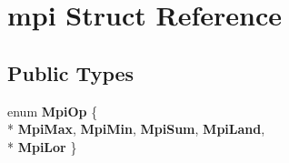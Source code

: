 \hypertarget{structmpi}{}\section{mpi Struct Reference}
\label{structmpi}
\subsection*{Public Types}
\begin{DoxyCompactItemize}
\item 
enum {\bfseries Mpi\+Op} \{ \\*
{\bfseries Mpi\+Max}, 
{\bfseries Mpi\+Min}, 
{\bfseries Mpi\+Sum}, 
{\bfseries Mpi\+Land}, 
\\*
{\bfseries Mpi\+Lor}
 \}\hypertarget{structmpi_a36d359a805acaaff794699115e4a3bda}{}\label{structmpi_a36d359a805acaaff794699115e4a3bda}

\end{DoxyCompactItemize}
